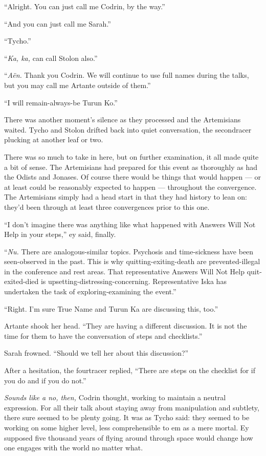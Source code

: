 ``Alright. You can just call me Codrin, by the way.''

``And you can just call me Sarah.''

``Tycho.''

``\emph{Ka, ka,} can call Stolon also.''

``\emph{Aën.} Thank you Codrin. We will continue to use full names during the talks, but you may call me Artante outside of them.''

``I will remain-always-be Turun Ko.''

There was another moment's silence as they processed and the Artemisians waited. Tycho and Stolon drifted back into quiet conversation, the secondracer plucking at another leaf or two.

There was so much to take in here, but on further examination, it all made quite a bit of sense. The Artemisians had prepared for this event as thoroughly as had the Odists and Jonases. Of course there would be things that would happen — or at least could be reasonably expected to happen — throughout the convergence. The Artemisians simply had a head start in that they had history to lean on: they'd been through at least three convergences prior to this one.

``I don't imagine there was anything like what happened with Answers Will Not Help in your steps,'' ey said, finally.

``\emph{Nu.} There are analogous-similar topics. Psychosis and time-sickness have been seen-observed in the past. This is why quitting-exiting-death are prevented-illegal in the conference and rest areas. That representative Answers Will Not Help quit-exited-died is upsetting-distressing-concerning. Representative Iska has undertaken the task of exploring-examining the event.''

``Right. I'm sure True Name and Turun Ka are discussing this, too.''

Artante shook her head. ``They are having a different discussion. It is not the time for them to have the conversation of steps and checklists.''

Sarah frowned. ``Should we tell her about this discussion?''

After a hesitation, the fourtracer replied, ``There are steps on the checklist for if you do and if you do not.''

\emph{Sounds like a no, then,} Codrin thought, working to maintain a neutral expression. For all their talk about staying away from manipulation and subtlety, there sure seemed to be plenty going. It was as Tycho said: they seemed to be working on some higher level, less comprehensible to em as a mere mortal. Ey supposed five thousand years of flying around through space would change how one engages with the world no matter what.

